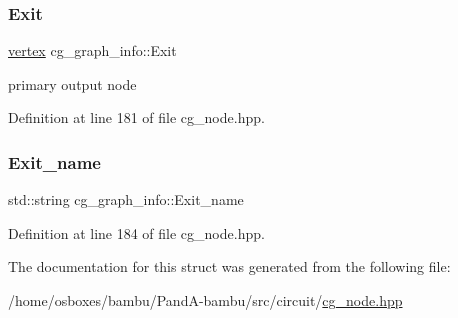 \subsubsection{\texorpdfstring{Exit}{Exit}}
{\footnotesize\ttfamily \hyperlink{graph_8hpp_abefdcf0544e601805af44eca032cca14}{vertex} cg\+\_\+graph\+\_\+info\+::\+Exit}



primary output node 



Definition at line 181 of file cg\+\_\+node.\+hpp.

\mbox{\label{structcg__graph__info_ab20b1d551fba4b5a403032df362ff894}} 
\subsubsection{\texorpdfstring{Exit\+\_\+name}{Exit\_name}}
{\footnotesize\ttfamily std\+::string cg\+\_\+graph\+\_\+info\+::\+Exit\+\_\+name}



Definition at line 184 of file cg\+\_\+node.\+hpp.



The documentation for this struct was generated from the following file\+:\begin{DoxyCompactItemize}
\item 
/home/osboxes/bambu/\+Pand\+A-\/bambu/src/circuit/\hyperlink{cg__node_8hpp}{cg\+\_\+node.\+hpp}\end{DoxyCompactItemize}
